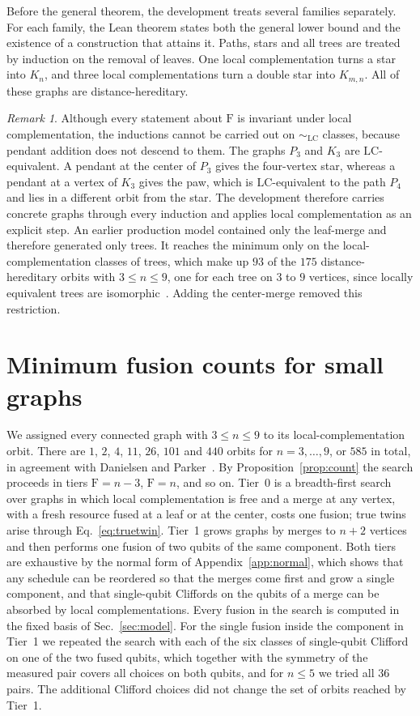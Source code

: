\documentclass[aps,pra,onecolumn,superscriptaddress,nofootinbib,longbibliography]{revtex4-2}
\theoremstyle{plain}
\theoremstyle{remark}
\newtheorem{remark}[theorem]{Remark}
\newcommand{\F}{\mathrm{F}}
\newcommand{\LC}{\mathrm{LC}}
\begin{document}
Before the general theorem, the development treats several families separately. For each family, the
Lean theorem states both the general lower bound and the existence of a construction that attains it.
Paths, stars and all trees are treated by induction on the removal of leaves. One local complementation
turns a star into $K_n$, and three local complementations turn a double star into $K_{m,n}$. All of these graphs are
distance-hereditary.

\begin{remark}\label{rem:concrete}
Although every statement about $\F$ is invariant under local complementation, the inductions cannot be
carried out on $\sim_{\LC}$ classes, because pendant addition does not descend to them. The graphs $P_3$
and $K_3$ are $\LC$-equivalent. A pendant at the center of $P_3$ gives the four-vertex star, whereas a
pendant at a vertex of $K_3$ gives the paw, which is $\LC$-equivalent to the path $P_4$ and lies in a
different orbit from the star. The development therefore carries concrete graphs through every induction
and applies local complementation as an explicit step. An earlier production model contained only the leaf-merge and
therefore generated only trees. It reaches the minimum only on the local-complementation classes of trees,
which make up $93$ of the $175$ distance-hereditary orbits with $3\le n\le 9$, one for each tree on $3$ to
$9$ vertices, since locally equivalent trees are isomorphic~\cite{Bouchet1988transforming}. Adding the
center-merge removed this restriction.
\end{remark}

\section{Minimum fusion counts for small graphs}\label{sec:table}

We assigned every connected graph with $3\le n\le 9$ to its local-complementation orbit. There are
$1$, $2$, $4$, $11$, $26$, $101$ and $440$ orbits for $n=3,\dots,9$, or $585$ in total, in agreement with Danielsen and
Parker~\cite{Danielsen2006classification}. By Proposition~\ref{prop:count} the search proceeds in tiers
$\F=n-3$, $\F=n$, and so on. Tier~0 is a breadth-first search over graphs in which local complementation is
free and a merge at any vertex, with a fresh resource fused at a leaf or at the center, costs one fusion;
true twins arise through Eq.~\eqref{eq:truetwin}. Tier~1 grows graphs by merges to $n+2$ vertices and then
performs one fusion of two qubits of the same component. Both tiers are exhaustive by the normal form of
Appendix~\ref{app:normal}, which shows that any schedule can be reordered so that the merges come first
and grow a single component, and that single-qubit Cliffords on the qubits of a merge can be absorbed by
local complementations. Every fusion in the search is computed in the fixed basis of Sec.~\ref{sec:model}.
For the single fusion inside the component in Tier~1 we repeated the search with each of the six classes of
single-qubit Clifford on one of the two fused qubits, which together with the symmetry of the measured pair
covers all choices on both qubits, and for $n\le 5$ we tried all $36$ pairs. The additional Clifford
choices did not change the set of orbits reached by Tier~1.
\end{document}
